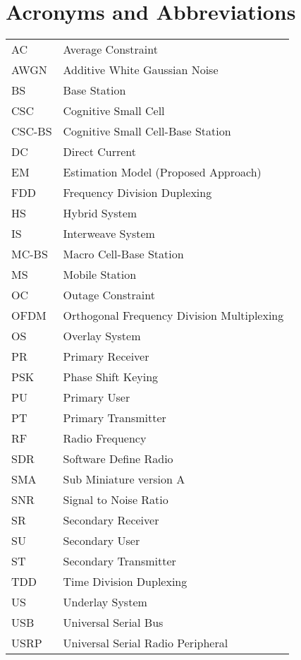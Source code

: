 
\chapter{Acronyms and Abbreviations}
\renewcommand{\arraystretch}{1.3}
\begin{longtable}{p{}p{}}
   	AC 	&	Average Constraint\\
   	AWGN	&	Additive White Gaussian Noise \\
	BS	&	Base Station \\
        CSC 	&	Cognitive Small Cell\\
	CSC-BS	&	Cognitive Small Cell-Base Station \\
	DC 	&	Direct Current \\
  	EM	&	Estimation Model (Proposed Approach) \\
	FDD	& 	Frequency Division Duplexing \\
	HS	& 	Hybrid System \\
	IS	& 	Interweave System \\
	MC-BS	&	Macro Cell-Base Station \\
	MS	&	Mobile Station \\
	OC	&	Outage Constraint \\
	OFDM	&	Orthogonal Frequency Division Multiplexing\\
	OS	&	Overlay System \\
	PR	& 	Primary Receiver \\
	PSK	& 	Phase Shift Keying \\
	PU	& 	Primary User \\
	PT	& 	Primary Transmitter \\
	RF	&	Radio Frequency \\
	SDR 	&	Software Define Radio \\
	SMA 	&	Sub Miniature version A\\
	SNR	&	Signal to Noise Ratio \\
	SR	& 	Secondary Receiver \\
	SU	&	Secondary User \\
	ST	& 	Secondary Transmitter \\
	TDD	& 	Time Division Duplexing \\
	US	&	Underlay System \\
	USB	&	Universal Serial Bus \\
	USRP	&	Universal Serial Radio Peripheral\\


\end{longtable}
